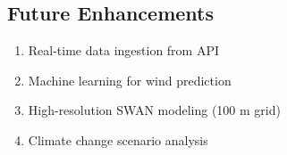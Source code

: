 \documentclass[12pt]{article}
\begin{document}
\subsection{Future Enhancements}

\begin{enumerate}
    \item Real-time data ingestion from API
    \item Machine learning for wind prediction
    \item High-resolution SWAN modeling (100 m grid)
    \item Climate change scenario analysis
\end{enumerate}
\end{document}
